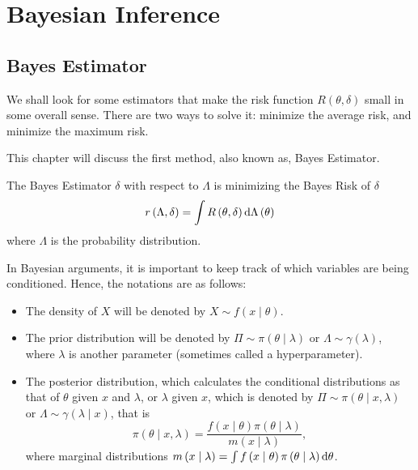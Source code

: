 \chapter{Bayesian Inference}

\section{Bayes Estimator}

We shall look for some estimators that make the risk function $R\left(\theta,\delta\right)$ small in some overall sense. There are two ways to solve it: minimize the average risk, and minimize the maximum risk.

This chapter will discuss the first method, also known as, Bayes Estimator.

\begin{definition} \label{def:bayes-estimator}
	The Bayes Estimator $\delta$ with respect to $\Lambda$ is minimizing the Bayes Risk of $\delta$
	\begin{equation}
		r\left(\Lambda, \delta\right)=\int R\left(\theta, \delta\right) \mathop{}\!\mathrm{d} \Lambda\left(\theta\right)
	\end{equation}
	where $\Lambda$ is the probability distribution.
\end{definition}

In Bayesian arguments, it is important to keep track of which variables are being conditioned. Hence, the notations are as follows:
\begin{itemize}
	\item The density of $X$ will be denoted by $X \sim f\left(x \mid \theta\right)$.
	\item The prior distribution will be denoted by $\Pi \sim \pi\left(\theta \mid \lambda\right)$ or $\Lambda \sim \gamma\left(\lambda\right)$, where $\lambda$ is another parameter (sometimes called a hyperparameter).
	\item The posterior distribution, which calculates the conditional distributions as that of $\theta$ given $x$ and $\lambda$, or $\lambda$ given $x$, which is denoted by $\Pi \sim \pi\left(\theta \mid x, \lambda\right)$ or $\Lambda \sim \gamma\left(\lambda \mid x\right)$, that is
	      \begin{equation}
		      \pi\left(\theta \mid x, \lambda\right) = \frac{f\left(x \mid \theta\right) \pi\left(\theta \mid \lambda\right)}{m\left(x \mid \lambda\right)},
	      \end{equation}
	      where marginal distributions $m\left(x \mid \lambda\right) = \int f\left(x \mid \theta\right) \pi\left(\theta \mid \lambda\right) \mathop{}\!\mathrm{d} \theta$.
\end{itemize}

